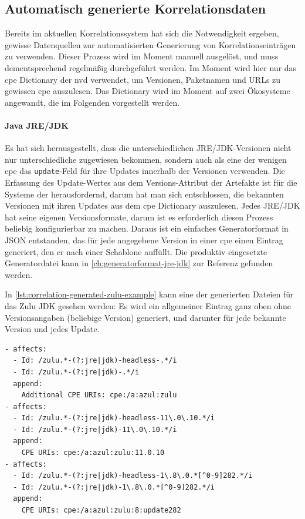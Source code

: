 \subsection{Automatisch generierte Korrelationsdaten}\label{subsec:old-generated-correlation-data}

Bereits im aktuellen Korrelationssystem hat sich die Notwendigkeit ergeben, gewisse Datenquellen zur automatisierten Generierung von Korrelationseinträgen zu verwenden.
Dieser Prozess wird im Moment manuell ausgelöst, und muss dementsprechend regelmäßig durchgeführt werden.
Im Moment wird hier nur das \acrshort{cpe} Dictionary der \acrshort{nvd} verwendet, um Versionen, Paketnamen und URLs zu gewissen \acrshort{cpe} auszulesen.
Das Dictionary wird im Moment auf zwei Ökosysteme angewandt, die im Folgenden vorgestellt werden.

\paragraph{Java JRE/JDK}
Es hat sich herausgestellt, dass die unterschiedlichen JRE/JDK-Versionen nicht nur unterschiedliche  zugewiesen bekommen, sondern auch als eine der wenigen \acrshort{cpe} das \texttt{update}-Feld für ihre Updates innerhalb der Versionen verwenden.
Die Erfassung des Update-Wertes aus dem Versions-Attribut der Artefakte ist für die Systeme der \metaeffektsp herausfordernd, darum hat man sich entschlossen, die bekannten Versionen mit ihren Updates aus dem \acrshort{cpe} Dictionary auszulesen.
Jedes JRE/JDK hat seine eigenen Versionsformate, darum ist es erforderlich diesen Prozess beliebig konfigurierbar zu machen.
Daraus ist ein einfaches Generatorformat in JSON entstanden, das für jede angegebene Version in einer \acrshort{cpe} einen Eintrag generiert, den er nach einer Schablone auffüllt.
Die produktiv eingesetzte Generatordatei kann in \autoref{ch:generatorformat-jre-jdk} zur Referenz gefunden werden.

In \autoref{lst:correlation-generated-zulu-example} kann eine der generierten Dateien für das Zulu JDK gesehen werden:
Es wird ein allgemeiner Eintrag ganz oben ohne Versionsangaben (beliebige Version) generiert, und darunter für jede bekannte Version und jedes Update.

\begin{lstlisting}[style=yaml,caption={Automatisch generierte Korrelationseinträge zu Zulu JDK},label={lst:correlation-generated-zulu-example}]
- affects:
  - Id: /zulu.*-(?:jre|jdk)-headless-.*/i
  - Id: /zulu.*-(?:jre|jdk)-.*/i
  append:
    Additional CPE URIs: cpe:/a:azul:zulu
- affects:
  - Id: /zulu.*-(?:jre|jdk)-headless-11\.0\.10.*/i
  - Id: /zulu.*-(?:jre|jdk)-11\.0\.10.*/i
  append:
    CPE URIs: cpe:/a:azul:zulu:11.0.10
- affects:
  - Id: /zulu.*-(?:jre|jdk)-headless-1\.8\.0.*[^0-9]282.*/i
  - Id: /zulu.*-(?:jre|jdk)-1\.8\.0.*[^0-9]282.*/i
  append:
    CPE URIs: cpe:/a:azul:zulu:8:update282
\end{lstlisting}

